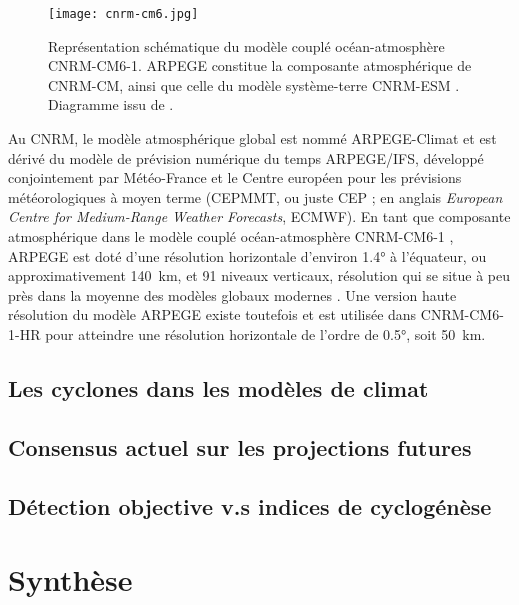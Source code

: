 \documentclass[../main.tex]{subfiles}
\begin{document}
\begin{figure}[t]
    \centering
    \texttt{[image: cnrm-cm6.jpg]}
    \caption{Représentation schématique du modèle couplé océan-atmosphère CNRM-CM6-1. \hbox{ARPEGE} constitue la composante atmosphérique de CNRM-CM, ainsi que celle du modèle système-terre CNRM-ESM \parencite{seferian_evaluation_2019}. Diagramme issu de \cite{voldoire_evaluation_2019}.}
    \label{fig:cnrm-cm6}
\end{figure}

Au CNRM, le modèle atmosphérique global est nommé ARPEGE-Climat \parencite{deque_arpege_1994} et est dérivé du modèle de prévision numérique du temps ARPEGE/IFS, développé conjointement par Météo-France et le Centre européen pour les prévisions météorologiques à moyen terme (CEPMMT, ou juste CEP ; en anglais \textit{European Centre for Medium-Range Weather Forecasts}, ECMWF). En tant que composante atmosphérique dans le modèle couplé océan-atmosphère \nolinebreak CNRM-CM6-1
\parencite{voldoire_evaluation_2019}, ARPEGE est doté d'une résolution horizontale d'environ \ang{1.4} à l'équateur, ou approximativement \SI{140}{\kilo\metre}, et \num{91} niveaux verticaux, résolution qui se situe à peu près dans la moyenne des modèles globaux modernes \parencite{ipcc_annex_2021}. Une version haute résolution du modèle ARPEGE existe toutefois et est utilisée dans CNRM-CM6-1-HR \parencite{saint-martin_tracking_2021} pour atteindre
une résolution horizontale de l'ordre de \ang{0.5}, soit \SI{50}{\kilo\metre}. 

\subsection{Les cyclones dans les modèles de climat}

\cite{manabe_tropical_1970}

\subsection{Consensus actuel sur les projections futures}\label{sec:projections_futures}

\cite{seneviratne_weather_2021}

\subsection{Détection objective v.s indices de cyclogénèse}

\section{Synthèse}
\end{document}
